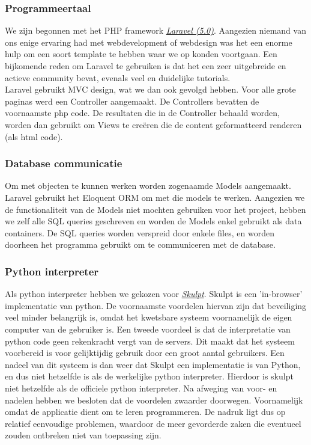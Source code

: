 \subsubsection{Programmeertaal}
We zijn begonnen met het PHP framework \href{http://laravel.com/}{\emph{Laravel (5.0)}}.
Aangezien niemand van ons enige ervaring had met webdevelopment of webdesign was het een
enorme hulp om een soort template te hebben waar we op konden voortgaan. Een bijkomende reden
om Laravel te gebruiken is dat het een zeer uitgebreide en actieve community bevat, evenals veel en
duidelijke tutorials. \\
Laravel gebruikt MVC design, wat we dan ook gevolgd hebben. Voor alle grote paginas
werd een Controller aangemaakt. De Controllers bevatten de voornaamste php code. De resultaten die in de
Controller behaald worden, worden dan gebruikt om Views te cre\"{e}ren die de content geformatteerd renderen (als html code).

\subsubsection{Database communicatie}
Om met objecten te kunnen werken worden zogenaamde Models aangemaakt. Laravel gebruikt het Eloquent ORM om met die models
te werken. Aangezien we de functionaliteit van de Models niet mochten gebruiken voor het project,
hebben we zelf alle SQL queries geschreven en worden de Models enkel gebruikt als data containers.
De SQL queries worden verspreid door enkele files, en worden doorheen het programma gebruikt om te communiceren
met de database.

\subsubsection{Python interpreter}
Als python interpreter hebben we gekozen voor \href{http://www.skulpt.org/}{\emph{Skulpt}}.
Skulpt is een 'in-browser' implementatie van python. De voornaamste voordelen hiervan zijn dat
beveiliging veel minder belangrijk is, omdat het kwetsbare systeem voornamelijk de eigen computer
van de gebruiker is. Een tweede voordeel is dat de interpretatie van python code geen rekenkracht vergt van
de servers. Dit maakt dat het systeem voorbereid is voor gelijktijdig gebruik door een groot aantal gebruikers.
Een nadeel van dit systeem is dan weer dat Skulpt een implementatie is van Python, en dus niet hetzelfde is als de
werkelijke python interpreter. Hierdoor is skulpt niet hetzelfde als de officiele python interpreter. Na
afweging van voor- en nadelen hebben we besloten dat de voordelen zwaarder doorwegen. Voornamelijk omdat
de applicatie dient om te leren programmeren. De nadruk ligt dus op relatief eenvoudige problemen, waardoor
de meer gevorderde zaken die eventueel zouden ontbreken niet van toepassing zijn.

